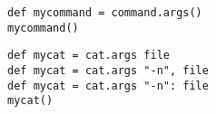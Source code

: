 \begin{lstlisting}[style=Groovybash, label={lst:example_args1}, title={Store the command in a variable with no arguments given.}]
def mycommand = command.args()
mycommand()
\end{lstlisting}

\begin{lstlisting}[style=Groovybash, label={lst:example_args2}, title={Store the command in a variable with arguments given either direct or by key=value pairs.}]
def mycat = cat.args file
def mycat = cat.args "-n", file
def mycat = cat.args "-n": file
mycat()
\end{lstlisting}

